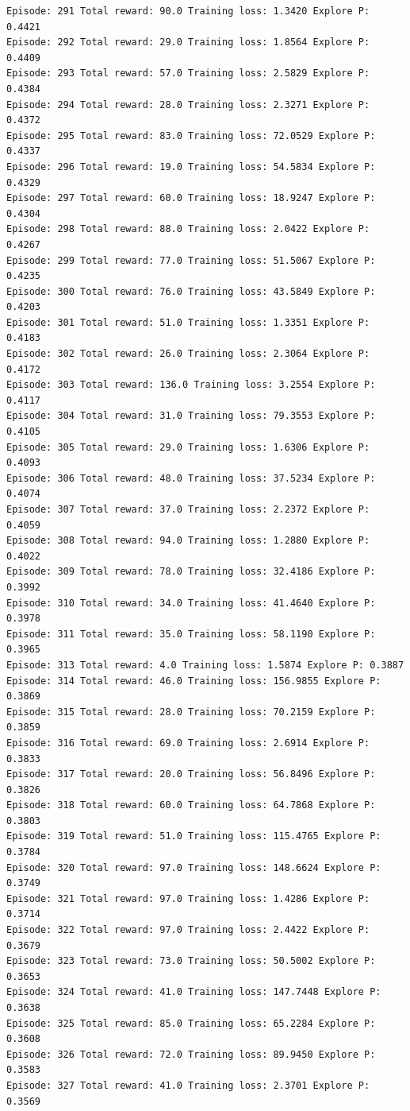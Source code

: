 \documentclass[11pt]{article}
\begin{document}
\begin{Verbatim}[commandchars=\\\{\}]
Episode: 291 Total reward: 90.0 Training loss: 1.3420 Explore P: 0.4421
Episode: 292 Total reward: 29.0 Training loss: 1.8564 Explore P: 0.4409
Episode: 293 Total reward: 57.0 Training loss: 2.5829 Explore P: 0.4384
Episode: 294 Total reward: 28.0 Training loss: 2.3271 Explore P: 0.4372
Episode: 295 Total reward: 83.0 Training loss: 72.0529 Explore P: 0.4337
Episode: 296 Total reward: 19.0 Training loss: 54.5834 Explore P: 0.4329
Episode: 297 Total reward: 60.0 Training loss: 18.9247 Explore P: 0.4304
Episode: 298 Total reward: 88.0 Training loss: 2.0422 Explore P: 0.4267
Episode: 299 Total reward: 77.0 Training loss: 51.5067 Explore P: 0.4235
Episode: 300 Total reward: 76.0 Training loss: 43.5849 Explore P: 0.4203
Episode: 301 Total reward: 51.0 Training loss: 1.3351 Explore P: 0.4183
Episode: 302 Total reward: 26.0 Training loss: 2.3064 Explore P: 0.4172
Episode: 303 Total reward: 136.0 Training loss: 3.2554 Explore P: 0.4117
Episode: 304 Total reward: 31.0 Training loss: 79.3553 Explore P: 0.4105
Episode: 305 Total reward: 29.0 Training loss: 1.6306 Explore P: 0.4093
Episode: 306 Total reward: 48.0 Training loss: 37.5234 Explore P: 0.4074
Episode: 307 Total reward: 37.0 Training loss: 2.2372 Explore P: 0.4059
Episode: 308 Total reward: 94.0 Training loss: 1.2880 Explore P: 0.4022
Episode: 309 Total reward: 78.0 Training loss: 32.4186 Explore P: 0.3992
Episode: 310 Total reward: 34.0 Training loss: 41.4640 Explore P: 0.3978
Episode: 311 Total reward: 35.0 Training loss: 58.1190 Explore P: 0.3965
Episode: 313 Total reward: 4.0 Training loss: 1.5874 Explore P: 0.3887
Episode: 314 Total reward: 46.0 Training loss: 156.9855 Explore P: 0.3869
Episode: 315 Total reward: 28.0 Training loss: 70.2159 Explore P: 0.3859
Episode: 316 Total reward: 69.0 Training loss: 2.6914 Explore P: 0.3833
Episode: 317 Total reward: 20.0 Training loss: 56.8496 Explore P: 0.3826
Episode: 318 Total reward: 60.0 Training loss: 64.7868 Explore P: 0.3803
Episode: 319 Total reward: 51.0 Training loss: 115.4765 Explore P: 0.3784
Episode: 320 Total reward: 97.0 Training loss: 148.6624 Explore P: 0.3749
Episode: 321 Total reward: 97.0 Training loss: 1.4286 Explore P: 0.3714
Episode: 322 Total reward: 97.0 Training loss: 2.4422 Explore P: 0.3679
Episode: 323 Total reward: 73.0 Training loss: 50.5002 Explore P: 0.3653
Episode: 324 Total reward: 41.0 Training loss: 147.7448 Explore P: 0.3638
Episode: 325 Total reward: 85.0 Training loss: 65.2284 Explore P: 0.3608
Episode: 326 Total reward: 72.0 Training loss: 89.9450 Explore P: 0.3583
Episode: 327 Total reward: 41.0 Training loss: 2.3701 Explore P: 0.3569

\end{Verbatim}
\end{document}
